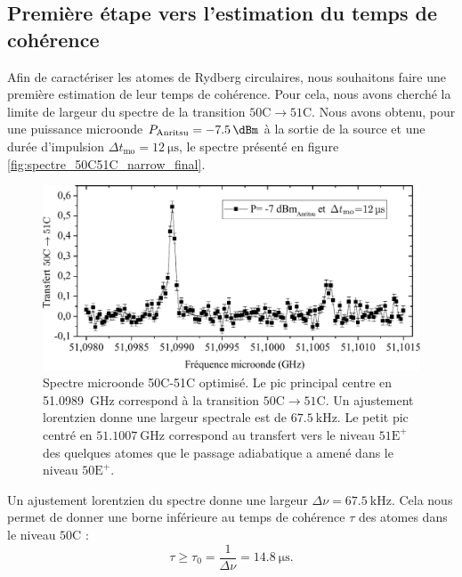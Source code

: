 \subsection{Première étape vers l'estimation du temps de cohérence}
\noindent Afin de caractériser les atomes de Rydberg circulaires, nous souhaitons faire une première estimation de leur temps de cohérence.
Pour cela, nous avons cherché la limite de largeur du spectre de la transition $\mathrm{50C\rightarrow 51C}$.
Nous avons obtenu, pour une puissance microonde $P_{\text{Anritsu}} = \SI{-7.5}{\dBm}$ à la sortie de la source et une durée d'impulsion $\Delta t_{\text{mo}} = \SI{12}{\us}$, le spectre présenté en figure \eqref{fig:spectre_50C51C_narrow_final}.

\begin{figure}[h]
\centering
\includegraphics[width=.9\linewidth]{figures/circulars/spectre_50C51C_narrow_final}
\caption[Spectre microonde 50C-51C optimisé]{
Spectre microonde 50C-51C optimisé.
Le pic principal centre en \SI{51.0989}{\GHz} correspond à la transition $\mathrm{50C \rightarrow 51C}$. Un ajustement lorentzien donne une largeur spectrale est de $\SI{67.5}{\kHz}$.
Le petit pic centré en $\SI{51.1007}{\GHz}$ correspond au transfert vers le niveau $\mathrm{51E^+}$ des quelques atomes que le passage adiabatique a amené dans le niveau $\mathrm{50E^+}$.
}
\label{fig:spectre_50C51C_narrow_final}
\end{figure}
	
Un ajustement lorentzien du spectre donne une largeur $\Delta\nu = \SI{67.5}{\kHz}$.
Cela nous permet de donner une borne inférieure au temps de cohérence $\tau$ des atomes dans le niveau $\mathrm{50C}$ :
\begin{equation}
\tau \geq \tau_0 = \frac{1}{\Delta\nu} = \SI{14.8}{\us}.
\end{equation}

